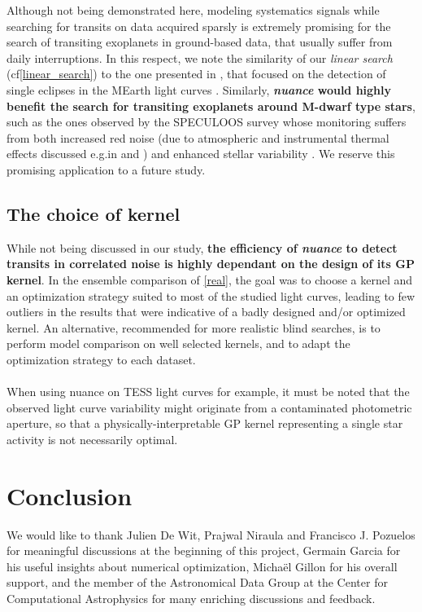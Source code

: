 \documentclass[modern]{aastex631}
\newcommand{\nuancemethod}{\textit{nuance}}
\newcommand{\nuancecode}{\textsf{nuance}}
\begin{document}
Although not being demonstrated here, modeling systematics signals while searching for transits on data acquired sparsly is extremely promising for the search of transiting exoplanets in ground-based data, that usually suffer from daily interruptions. In this respect, we note the similarity of our \textit{linear search} (cf\;\autoref{linear_search}) to the one presented in \citealt{Berta2012}, that focused on the detection of single eclipses in the MEarth light curves \citep{Irwin2009}. Similarly, \textbf{\nuancemethod{} would highly benefit the search for transiting exoplanets around M-dwarf type stars}, such as the ones observed by the SPECULOOS survey \citep{speculoos} whose monitoring suffers from both increased red noise (due to atmospheric and instrumental thermal effects discussed e.g.\;in \citealt{Berta2012} and  \citealt{Pedersen2023}) and enhanced stellar variability \citep{Murray2020}. We reserve this promising application to a future study.

\subsection{The choice of kernel}
While not being discussed in our study, \textbf{the efficiency of \nuancemethod{} to detect transits in correlated noise is highly dependant on the design of its GP kernel}. In the ensemble comparison of \autoref{real}, the goal was to choose a kernel and an optimization strategy suited to most of the studied light curves, leading to few outliers in the results that were indicative of a badly designed and/or optimized kernel. An alternative, recommended for more realistic blind searches, is to perform model comparison on well selected kernels, and to adapt the optimization strategy to each dataset.\\\\
When using \nuancecode{} on TESS light curves for example, it must be noted that the observed light curve variability might originate from a contaminated photometric aperture, so that a physically-interpretable GP kernel representing a single star activity is not necessarily optimal.

\section{Conclusion}



We would like to thank Julien De Wit, Prajwal Niraula and Francisco J. Pozuelos for meaningful discussions at the beginning of this project, Germain Garcia for his useful insights about numerical optimization, Michaël Gillon for his overall support, and the member of the Astronomical Data Group at the Center for Computational Astrophysics for many enriching discussions and feedback.
\end{document}
